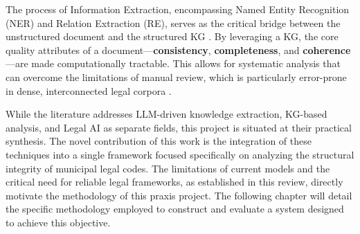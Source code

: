 The process of Information Extraction, encompassing Named Entity Recognition (NER) and Relation Extraction (RE), serves as the critical bridge between the unstructured document and the structured KG \parencite{RefWorks:RefID:160-xu2024large}. By leveraging a KG, the core quality attributes of a document—\textbf{consistency}, \textbf{completeness}, and \textbf{coherence}—are made computationally tractable. This allows for systematic analysis that can overcome the limitations of manual review, which is particularly error-prone in dense, interconnected legal corpora \parencite{RefWorks:RefID:10-zowghi2003interplay, RefWorks:RefID:68-beth2018bills}.

While the literature addresses LLM-driven knowledge extraction, KG-based analysis, and Legal AI as separate fields, this project is situated at their practical synthesis. The novel contribution of this work is the integration of these techniques into a single framework focused specifically on analyzing the structural integrity of municipal legal codes. The limitations of current models and the critical need for reliable legal frameworks, as established in this review, directly motivate the methodology of this praxis project. The following chapter will detail the specific methodology employed to construct and evaluate a system designed to achieve this objective.
